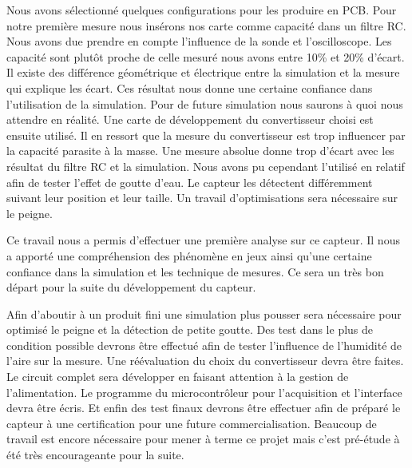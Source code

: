 Nous avons sélectionné quelques configurations pour les produire en PCB. Pour notre première mesure nous insérons nos carte comme capacité dans un filtre RC. Nous avons due prendre en compte l’influence de la sonde et l'oscilloscope. Les capacité sont plutôt proche de celle mesuré nous avons entre 10\% et 20\% d'écart. Il existe des différence géométrique et électrique entre la simulation et la mesure qui explique les écart. Ces résultat nous donne une certaine confiance dans l'utilisation de la simulation. Pour de future simulation nous saurons à quoi nous attendre en réalité. Une carte de développement du convertisseur choisi est ensuite utilisé. Il en ressort que la mesure du convertisseur est trop influencer par la capacité parasite à la masse. Une mesure absolue donne trop d'écart avec les résultat du filtre RC et la simulation. Nous avons pu cependant l'utilisé en relatif afin de tester l'effet de goutte d'eau. Le capteur les détectent différemment suivant leur position et leur taille. Un travail d'optimisations sera nécessaire sur le peigne.

Ce travail nous a permis d'effectuer une première analyse sur ce capteur. Il nous a apporté une compréhension des phénomène en jeux ainsi qu'une certaine confiance dans la simulation et les technique de mesures. Ce sera un très bon départ pour la suite du développement du capteur.

Afin d'aboutir à un produit fini une simulation plus pousser sera nécessaire pour optimisé le peigne et la détection de petite goutte. Des test dans le plus de condition possible devrons être effectué afin de tester l’influence de l'humidité de l'aire sur la mesure. Une réévaluation du choix du convertisseur devra être faites. Le circuit complet sera développer en faisant attention à la gestion de l'alimentation. Le programme du microcontrôleur pour l'acquisition et l'interface devra être écris. Et enfin des test finaux devrons être effectuer afin de préparé le capteur à une certification pour une future commercialisation. Beaucoup de travail est encore nécessaire pour mener à terme ce projet mais c'est pré-étude à été très encourageante pour la suite. 
